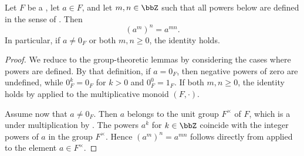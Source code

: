 \begin{lemma} \label{lemma:power_of_a_power_in_a_field_for_integer_exponents_is_power_by_product_of_the_exponents}
    Let $F$ be a , let $a \in F$, and let $m, n \in \bbZ$ such that all powers below are defined in the sense of . Then
    $$ (a^m)^n = a^{mn}. $$
    In particular, if $a \neq 0_F$ or both $m, n \geq 0$, the identity holds.
\end{lemma}

\begin{proof}
    We reduce to the group-theoretic lemmas by considering the cases where powers are defined. By that definition, if $a = 0_F$, then negative powers of zero are undefined, while $0_F^k = 0_F$ for $k > 0$ and $0_F^0 = 1_F$. If both $m, n \geq 0$, the identity holds by  applied to the multiplicative monoid $(F, \cdot)$.

    Assume now that $a \neq 0_F$. Then $a$ belongs to the unit group $F^\times$ of $F$, which is a  under multiplication by . The powers $a^k$ for $k \in \bbZ$ coincide with the integer powers of $a$ in the group $F^\times$. Hence $(a^m)^n = a^{mn}$ follows directly from  applied to the element $a \in F^\times$.
\end{proof}
